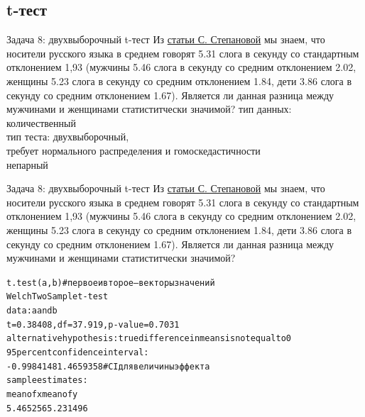 \subsection{t-тест}
\begin{frame}{Задача 8: двухвыборочный t-тест}
Из \href{https://www.internationalphoneticassociation.org/icphs-proceedings/ICPhS2011/OnlineProceedings/RegularSession/Stepanova/Stepanova.pdf}{\alert{статьи С. Степановой}} мы знаем, что носители русского языка в среднем говорят 5.31 слога в секунду со стандартным отклонением 1,93 (мужчины 5.46 слога в секунду  со средним отклонением 2.02, женщины 5.23 слога в секунду  со средним отклонением 1.84, дети 3.86 слога в секунду со средним отклонением 1.67). Является ли данная разница между мужчинами и женщинами статиститчески значимой?
\vfill
тип данных: количественный\\
тип теста: двухвыборочный,\\
требует нормального распределения и гомоскедастичности\\
непарный
\end{frame}
\begin{frame}{Задача 8: двухвыборочный t-тест}
Из \href{https://www.internationalphoneticassociation.org/icphs-proceedings/ICPhS2011/OnlineProceedings/RegularSession/Stepanova/Stepanova.pdf}{\alert{статьи С. Степановой}} мы знаем, что носители русского языка в среднем говорят 5.31 слога в секунду со стандартным отклонением 1,93 (мужчины 5.46 слога в секунду  со средним отклонением 2.02, женщины 5.23 слога в секунду  со средним отклонением 1.84, дети 3.86 слога в секунду со средним отклонением 1.67). Является ли данная разница между мужчинами и женщинами статиститчески значимой?
\vfill
\scriptsize
\begin{alltt}
\alert{t.test(a, b)} \hfill \# первое и второе — векторы значений\medskip\\
Welch Two Sample t-test\\
data:  a and b\\
\alert{t = 0.38408, df = 37.919, p-value = 0.7031}\\
alternative hypothesis: true difference in means is not equal to 0\\
95 percent confidence interval: \\
 -0.9984148  1.4659358 \hfill \# CI для величины эффекта\\
sample estimates:\\
mean of x mean of y \\
 5.465256  5.231496
\end{alltt}
\normalsize
\end{frame}
